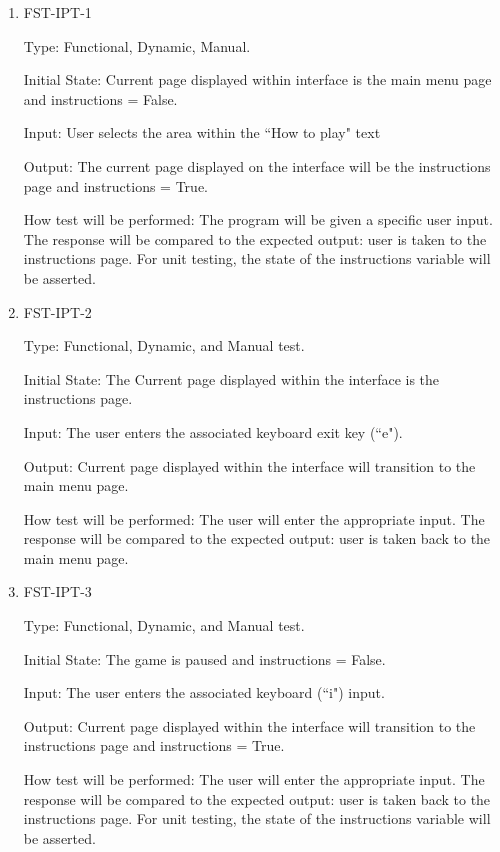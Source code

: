 \documentclass[12pt, titlepage]{article}
\begin{document}
	\begin{enumerate}
		
		\item{FST-IPT-1\\}
		
		Type: Functional, Dynamic, Manual.
		
		Initial State: Current page displayed within interface is the main menu page and instructions = False.
		
		Input: User selects the area within the ``How to play" text
		
		Output: The current page displayed on the interface will be the instructions page and instructions = True.
		
		How test will be performed: The program will be given a specific user input. The response will be compared to the expected output: user is taken to the instructions page. For unit testing, the state of the instructions variable will be asserted.
		
		\item{FST-IPT-2\\}
		
		Type: Functional, Dynamic, and Manual test.
		
		Initial State: The Current page displayed within the interface is the instructions page.
		
		Input: The user enters the associated keyboard exit key (``e").
		
		Output: Current page displayed within the interface will transition to the main menu page.
		
		How test will be performed: The user will enter the appropriate input. The response will be compared to the expected output: user is taken back to the main menu page.
		
		
		\item{FST-IPT-3\\}
		
		Type: Functional, Dynamic, and Manual test.
		
		Initial State:  The game is paused and instructions = False.
		
		Input: The user enters the associated keyboard (``i") input.
		
		Output: Current page displayed within the interface will transition to the instructions page and instructions = True.
		
		How test will be performed: The user will enter the appropriate input. The response will be compared to the expected output: user is taken back to the instructions page. For unit testing, the state of the instructions variable will be asserted.
		

\end{enumerate}
\end{document}
